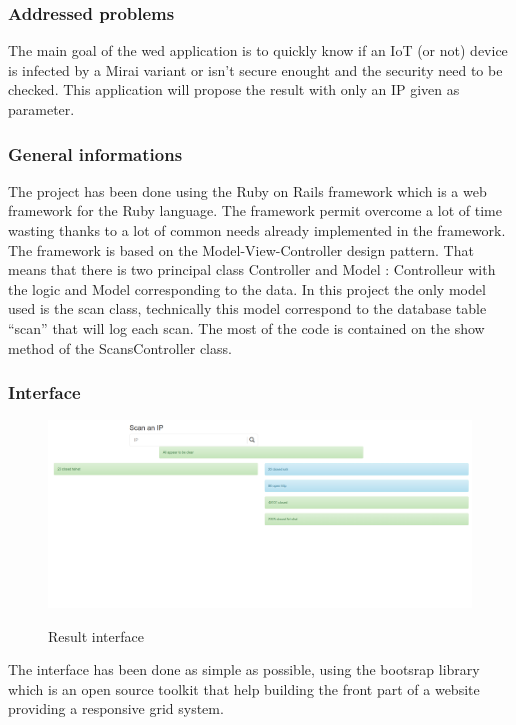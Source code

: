\documentclass{report}
\begin{document}
\subsubsection{Addressed problems}
The main goal of the wed application is to quickly know if an IoT (or not) device is infected by a Mirai variant or isn't secure enought and the security need to be checked. This application will propose the result with only an IP given as parameter.

\subsubsection{General informations}
The project has been done using the Ruby on Rails framework which is a web framework for the Ruby language. The framework permit overcome a lot of time wasting thanks to a lot of common needs  already implemented in the framework. The framework is based on the Model-View-Controller design pattern. That means that there is two principal class Controller and Model : Controlleur with the logic and Model corresponding to the data. In this project the only model used is the scan class, technically this model correspond to the database table ``scan'' that will log each scan. The most of the code is contained on the show method of the ScansController class.

\subsubsection{Interface}
\begin{figure}[h]
 \caption{Result interface}
 \centering
 \includegraphics[width=1.3\textwidth]{./img/vulweb-result}
 \label{fig:screen-act}
\end{figure}
The interface has been done as simple as possible, using the bootsrap library \autocite{bootstrap} which is an open source toolkit that help building the front part of a website providing a responsive grid system.
\end{document}
